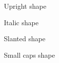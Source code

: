 \documentclass[a4paper,12pt]{article}
\begin{document}
	\begin{upshape}Upright shape\end{upshape}\par
	\begin{itshape}Italic shape\end{itshape}\par
	\begin{slshape}Slanted shape\end{slshape}\par
	\begin{scshape}Small caps shape\end{scshape}
	
\end{document}
